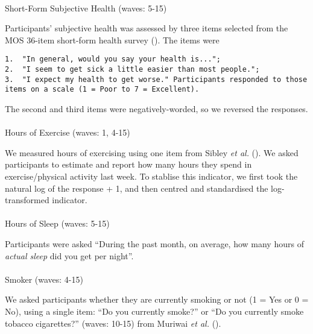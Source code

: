 \documentclass[
  singlecolumn,
  9pt]{article}
\makeatletter
\let\oldparagraph\paragraph
\renewcommand{\paragraph}{
    \@ifstar
      \xxxParagraphStar
      \xxxParagraphNoStar
  }
\newcommand{\xxxParagraphStar}[1]{\oldparagraph*{#1}\mbox{}}
\newcommand{\xxxParagraphNoStar}[1]{\oldparagraph{#1}\mbox{}}
\makeatother
\begin{document}
\paragraph{Short-Form Subjective Health (waves:
5-15)}\label{short-form-subjective-health-waves-5-15}

Participants' subjective health was assessed by three items selected
from the MOS 36-item short-form health survey
(). The items were

\begin{verbatim}
1.  "In general, would you say your health is...";
2.  "I seem to get sick a little easier than most people.";
3.  "I expect my health to get worse." Participants responded to those items on a scale (1 = Poor to 7 = Excellent).
\end{verbatim}

The second and third items were negatively-worded, so we reversed the
responses.

\paragraph{Hours of Exercise (waves: 1,
4-15)}\label{hours-of-exercise-waves-1-4-15}

We measured hours of exercising using one item from Sibley \emph{et al.}
(). We asked participants to estimate and
report how many hours they spend in exercise/physical activity last
week. To stablise this indicator, we first took the natural log of the
response + 1, and then centred and standardised the log-transformed
indicator.

\paragraph{Hours of Sleep (waves:
5-15)}\label{hours-of-sleep-waves-5-15}

Participants were asked ``During the past month, on average, how many
hours of \emph{actual sleep} did you get per night''.

\paragraph{Smoker (waves: 4-15)}\label{smoker-waves-4-15}

We asked participants whether they are currently smoking or not (1 = Yes
or 0 = No), using a single item: ``Do you currently smoke?'' or ``Do you
currently smoke tobacco cigarettes?'' (waves: 10-15) from Muriwai
\emph{et al.} ().
\end{document}
